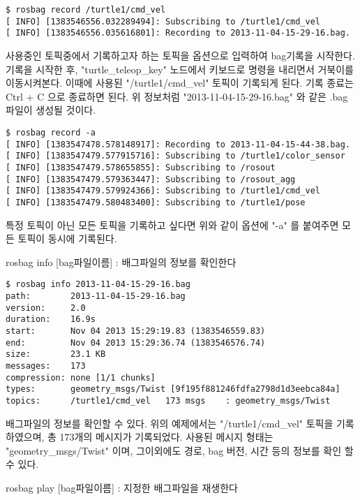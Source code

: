 \begin{lstlisting}[language=ROS]
$ rosbag record /turtle1/cmd_vel
[ INFO] [1383546556.032289494]: Subscribing to /turtle1/cmd_vel
[ INFO] [1383546556.035616801]: Recording to 2013-11-04-15-29-16.bag.
\end{lstlisting}

\noindent
사용중인 토픽중에서 기록하고자 하는 토픽을 옵션으로 입력하여 bag기록을 시작한다. 기록을 시작한 후, "turtle\_teleop\_key" 노드에서 키보드로 명령을 내리면서 거북이를 이동시켜본다. 이때에 사용된 "/turtle1/cmd\_vel" 토픽이 기록되게 된다. 기록 종료는 Ctrl + C 으로 종료하면 된다. 위 정보처럼 "2013-11-04-15-29-16.bag" 와 같은 .bag 파일이 생성될 것이다.

\begin{lstlisting}[language=ROS]
$ rosbag record -a
[ INFO] [1383547478.578148917]: Recording to 2013-11-04-15-44-38.bag.
[ INFO] [1383547479.577915716]: Subscribing to /turtle1/color_sensor
[ INFO] [1383547479.578655855]: Subscribing to /rosout
[ INFO] [1383547479.579363447]: Subscribing to /rosout_agg
[ INFO] [1383547479.579924366]: Subscribing to /turtle1/cmd_vel
[ INFO] [1383547479.580483400]: Subscribing to /turtle1/pose
\end{lstlisting}

\noindent
특정 토픽이 아닌 모든 토픽을 기록하고 싶다면 위와 같이 옵션에 "-a" 를 붙여주면 모든 토픽이 동시에 기록된다.

\vspace{\baselineskip}
\noindent
{}\circled{\thenum} rosbag info [bag파일이름] : 배그파일의 정보를 확인한다

\begin{lstlisting}[language=ROS]
$ rosbag info 2013-11-04-15-29-16.bag 
path:        2013-11-04-15-29-16.bag
version:     2.0
duration:    16.9s
start:       Nov 04 2013 15:29:19.83 (1383546559.83)
end:         Nov 04 2013 15:29:36.74 (1383546576.74)
size:        23.1 KB
messages:    173
compression: none [1/1 chunks]
types:       geometry_msgs/Twist [9f195f881246fdfa2798d1d3eebca84a]
topics:      /turtle1/cmd_vel   173 msgs    : geometry_msgs/Twist
\end{lstlisting}

\noindent
배그파일의 정보를 확인할 수 있다. 위의 예제에서는 "/turtle1/cmd\_vel" 토픽을 기록하였으며, 총 173개의 메시지가 기록되었다. 사용된 메시지 형태는 "geometry\_msgs/Twist" 이며, 그이외에도 경로, bag 버전, 시간 등의 정보를 확인 할 수 있다.

\vspace{\baselineskip}
\noindent
{}\circled{\thenum} rosbag play [bag파일이름] : 지정한 배그파일을 재생한다

